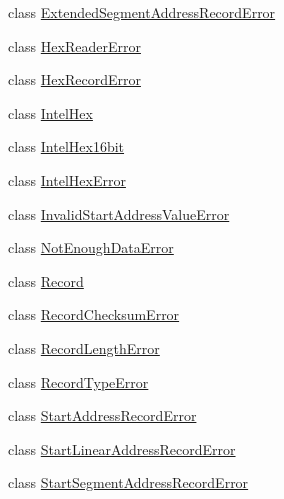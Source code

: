 \begin{DoxyCompactItemize}
class \hyperlink{classsoftware_1_1chipwhisperer_1_1capture_1_1utils_1_1IntelHex_1_1ExtendedSegmentAddressRecordError}{Extended\+Segment\+Address\+Record\+Error}
\item 
class \hyperlink{classsoftware_1_1chipwhisperer_1_1capture_1_1utils_1_1IntelHex_1_1HexReaderError}{Hex\+Reader\+Error}
\item 
class \hyperlink{classsoftware_1_1chipwhisperer_1_1capture_1_1utils_1_1IntelHex_1_1HexRecordError}{Hex\+Record\+Error}
\item 
class \hyperlink{classsoftware_1_1chipwhisperer_1_1capture_1_1utils_1_1IntelHex_1_1IntelHex}{Intel\+Hex}
\item 
class \hyperlink{classsoftware_1_1chipwhisperer_1_1capture_1_1utils_1_1IntelHex_1_1IntelHex16bit}{Intel\+Hex16bit}
\item 
class \hyperlink{classsoftware_1_1chipwhisperer_1_1capture_1_1utils_1_1IntelHex_1_1IntelHexError}{Intel\+Hex\+Error}
\item 
class \hyperlink{classsoftware_1_1chipwhisperer_1_1capture_1_1utils_1_1IntelHex_1_1InvalidStartAddressValueError}{Invalid\+Start\+Address\+Value\+Error}
\item 
class \hyperlink{classsoftware_1_1chipwhisperer_1_1capture_1_1utils_1_1IntelHex_1_1NotEnoughDataError}{Not\+Enough\+Data\+Error}
\item 
class \hyperlink{classsoftware_1_1chipwhisperer_1_1capture_1_1utils_1_1IntelHex_1_1Record}{Record}
\item 
class \hyperlink{classsoftware_1_1chipwhisperer_1_1capture_1_1utils_1_1IntelHex_1_1RecordChecksumError}{Record\+Checksum\+Error}
\item 
class \hyperlink{classsoftware_1_1chipwhisperer_1_1capture_1_1utils_1_1IntelHex_1_1RecordLengthError}{Record\+Length\+Error}
\item 
class \hyperlink{classsoftware_1_1chipwhisperer_1_1capture_1_1utils_1_1IntelHex_1_1RecordTypeError}{Record\+Type\+Error}
\item 
class \hyperlink{classsoftware_1_1chipwhisperer_1_1capture_1_1utils_1_1IntelHex_1_1StartAddressRecordError}{Start\+Address\+Record\+Error}
\item 
class \hyperlink{classsoftware_1_1chipwhisperer_1_1capture_1_1utils_1_1IntelHex_1_1StartLinearAddressRecordError}{Start\+Linear\+Address\+Record\+Error}
\item 
class \hyperlink{classsoftware_1_1chipwhisperer_1_1capture_1_1utils_1_1IntelHex_1_1StartSegmentAddressRecordError}{Start\+Segment\+Address\+Record\+Error}
\end{DoxyCompactItemize}
